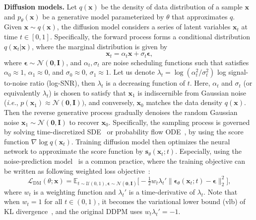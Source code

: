 \vspace{0.05in}
\noindent
{\bf Diffusion models.}
Let $q(\mathbf{x})$ be the density of data distribution of a sample $\mathbf{x}$ and $p_\theta(\mathbf{x})$ be a generative model parameterized by $\theta$ that approximates $q$. 
Given $\mathbf{x}\sim q(\mathbf{x})$, the diffusion model considers a series of latent variables $\mathbf{x}_t$ at time $t\in[0,1]$. 
Specifically, the forward process forms a conditional distribution $q(\mathbf{x}_t|\mathbf{x})$, where the marginal distribution is given by 
\begin{equation}
\mathbf{x}_t = \alpha_t \mathbf{x} + \sigma_t \boldsymbol{\epsilon}\text{,}
\end{equation}
where $\boldsymbol{\epsilon}\sim\mathcal{N}(\boldsymbol{0}, \mathbf{I})$, and $\alpha_t, \sigma_t$ are noise scheduling functions such that satisfies $\alpha_0 \approx 1$, $\alpha_1\approx 0$, and $\sigma_0 \approx 0$, $\sigma_1 \approx 1$.
Let us denote $\lambda_t = \log (\alpha_t^2 / \sigma_t^2)$ log signal-to-noise ratio (log-SNR), then $\lambda_t$ is a decreasing function of $t$.
Here, $\alpha_t$ and $\sigma_t$ (or equivalently $\lambda_t$) is chosen to satisfy that $\mathbf{x}_1$ is indiscernible from Gaussian noise (\emph{i.e.}, $p(\mathbf{x}_1)\approx \mathcal{N}(\boldsymbol{0}, \mathbf{I}))$, and conversely, $\mathbf{x}_0$ matches the data density $q(\mathbf{x})$. 
Then the reverse generative process gradually denoises the random Gaussian noise $\mathbf{x}_1\sim\mathcal{N}(\boldsymbol{0},\mathbf{I})$ to recover $\mathbf{x}_0$.
Specifically, the sampling process is governed by solving time-discretized SDE~\citep{song2020score, ho2020denoising} or probability flow ODE~\citep{song2020denoising, karras2022elucidating}, by using the score function $\nabla \log q(\mathbf{x}_t)$.
Training diffusion model then optimizes the neural network to approximate the score function by $\mathbf{s}_\theta(\mathbf{x}_t;t)$.
Especially, using the noise-prediction model~\citep{ho2020denoising} is a common practice, where the training objective can be written as following weighted loss objective~\citep{kingma2023understanding}:
\begin{equation}\label{eq:epsloss}
    \mathcal{L}_{\textrm{DM}}(\theta;\mathbf{x}) =\mathbb{E}_{t\sim \mathcal{U}(0,1), \boldsymbol{\epsilon}\sim\mathcal{N}(\boldsymbol{0},\mathbf{I})}\big[-\tfrac{1}{2}w_t\lambda_t'\|\boldsymbol{\epsilon}_\theta(\mathbf{x}_t;t) - \boldsymbol{\epsilon}\|_2^2\big]\text{,}
\end{equation}
where $w_t$ is a weighting function and $\lambda_t'$ is a time-derivative of $\lambda_t$.
Note that when $w_t=1$ for all $t\in(0,1)$, it becomes the variational lower bound (vlb) of KL divergence~\citep{kingma2021variational}, and the original DDPM uses $w_t\lambda_t'=-1$. 

